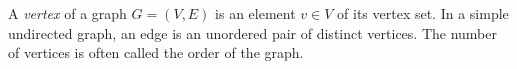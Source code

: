 
A \emph{vertex} of a graph $G=(V,E)$ is an element $v\in V$ of its vertex set. In a simple undirected graph, an edge is an unordered pair of distinct vertices. The number of vertices is often called the order of the graph.
